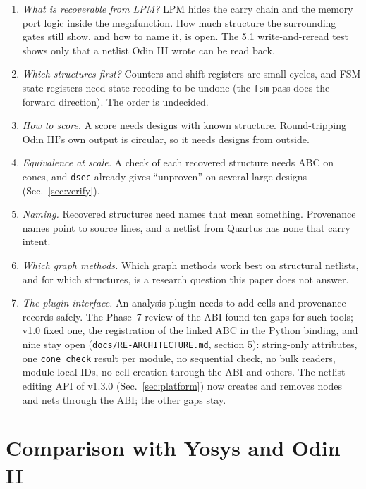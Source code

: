 \documentclass[conference]{IEEEtran}
\newcommand{\code}[1]{\texttt{#1}}
\begin{document}
\begin{enumerate}
\item \emph{What is recoverable from LPM?} LPM hides the carry chain and the memory port logic
  inside the megafunction. How much structure the surrounding gates still show, and how to name
  it, is open. The 5.1 write-and-reread test shows only that a netlist Odin III wrote can be
  read back.
\item \emph{Which structures first?} Counters and shift registers are small cycles, and FSM
  state registers need state recoding to be undone (the \code{fsm} pass does the forward
  direction). The order is undecided.
\item \emph{How to score.} A score needs designs with known structure. Round-tripping
  Odin III's own output is circular, so it needs designs from outside.
\item \emph{Equivalence at scale.} A check of each recovered structure needs ABC on cones, and
  \code{dsec} already gives ``unproven'' on several large designs (Sec.~\ref{sec:verify}).
\item \emph{Naming.} Recovered structures need names that mean something. Provenance names
  point to source lines, and a netlist from Quartus has none that carry intent.
\item \emph{Which graph methods.} Which graph methods work best on structural netlists, and
  for which structures, is a research question this paper does not answer.
\item \emph{The plugin interface.} An analysis plugin needs to add cells and provenance records
  safely. The Phase~7 review of the ABI found ten gaps for such tools; v1.0 fixed one, the
  registration of the linked ABC in the Python binding, and nine stay open
  (\code{docs/RE-ARCHITECTURE.md}, section 5): string-only attributes, one \code{cone\_check}
  result per module, no sequential check, no bulk readers, module-local IDs, no cell creation
  through the ABI and others. The netlist editing API of v1.3.0 (Sec.~\ref{sec:platform}) now creates and removes nodes and nets through the ABI; the other gaps stay.
\end{enumerate}

\section{Comparison with Yosys and Odin II}
\label{sec:compare}
\end{document}
